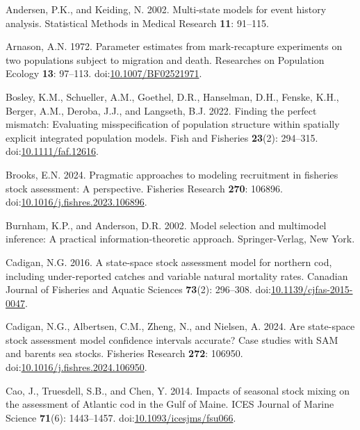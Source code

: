 \documentclass[
]{article}
\newlength{\cslhangindent}
\newlength{\cslentryspacingunit} %
\newenvironment{CSLReferences}[2] %
 {%
  \setlength{\parindent}{0pt}
  \ifodd #1
  \let\oldpar\par
  \def\par{\hangindent=\cslhangindent\oldpar}
  \fi
  \setlength{\parskip}{#2\cslentryspacingunit}
 }%
 {}
\begin{document}
\hypertarget{refs}{}
\begin{CSLReferences}{1}{0}
\leavevmode{}%
Andersen, P.K., and Keiding, N. 2002. Multi-state models for event
history analysis. Statistical Methods in Medical Research \textbf{11}:
91--115.

\leavevmode{}%
Arnason, A.N. 1972. Parameter estimates from mark-recapture experiments
on two populations subject to migration and death. Researches on
Population Ecology \textbf{13}: 97--113.
doi:\href{https://doi.org/10.1007/BF02521971}{10.1007/BF02521971}.

\leavevmode{}%
Bosley, K.M., Schueller, A.M., Goethel, D.R., Hanselman, D.H., Fenske,
K.H., Berger, A.M., Deroba, J.J., and Langseth, B.J. 2022. Finding the
perfect mismatch: Evaluating misspecification of population structure
within spatially explicit integrated population models. Fish and
Fisheries \textbf{23}(2): 294--315.
doi:\href{https://doi.org/10.1111/faf.12616}{10.1111/faf.12616}.

\leavevmode{}%
Brooks, E.N. 2024. Pragmatic approaches to modeling recruitment in
fisheries stock assessment: A perspective. Fisheries Research
\textbf{270}: 106896.
doi:\href{https://doi.org/10.1016/j.fishres.2023.106896}{10.1016/j.fishres.2023.106896}.

\leavevmode{}%
Burnham, K.P., and Anderson, D.R. 2002. Model selection and multimodel
inference: A practical information-theoretic approach. Springer-Verlag,
New York.

\leavevmode{}%
Cadigan, N.G. 2016. A state-space stock assessment model for northern
cod, including under-reported catches and variable natural mortality
rates. Canadian Journal of Fisheries and Aquatic Sciences
\textbf{73}(2): 296--308.
doi:\href{https://doi.org/10.1139/cjfas-2015-0047}{10.1139/cjfas-2015-0047}.

\leavevmode{}%
Cadigan, N.G., Albertsen, C.M., Zheng, N., and Nielsen, A. 2024. Are
state-space stock assessment model confidence intervals accurate? Case
studies with SAM and barents sea stocks. Fisheries Research
\textbf{272}: 106950.
doi:\href{https://doi.org/10.1016/j.fishres.2024.106950}{10.1016/j.fishres.2024.106950}.

\leavevmode{}%
Cao, J., Truesdell, S.B., and Chen, Y. 2014. Impacts of seasonal stock
mixing on the assessment of {A}tlantic cod in the {G}ulf of {M}aine.
ICES Journal of Marine Science \textbf{71}(6): 1443--1457.
doi:\href{https://doi.org/10.1093/icesjms/fsu066}{10.1093/icesjms/fsu066}.


\end{CSLReferences}
\end{document}
